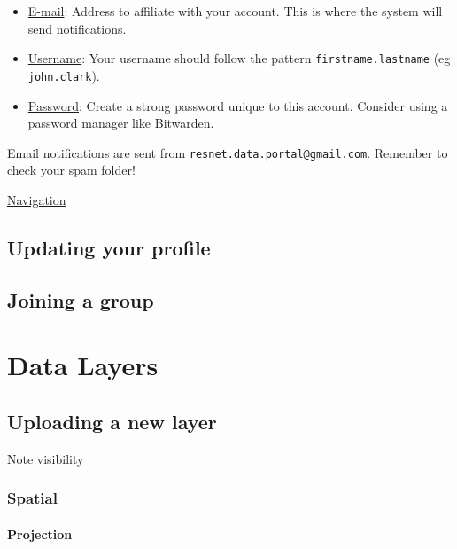 \documentclass[
]{book}
\providecommand{\tightlist}{%
  \setlength{\itemsep}{0pt}\setlength{\parskip}{0pt}}
\begin{document}
\begin{itemize}
\tightlist
\item
  \underline{E-mail}: Address to affiliate with your account. This is where the system will send notifications.
\item
  \underline{Username}: Your username should follow the pattern \texttt{firstname.lastname} (eg \texttt{john.clark}).
\item
  \underline{Password}: Create a strong password unique to this account. Consider using a password manager like \href{https://bitwarden.com/}{Bitwarden}.
\end{itemize}

Email notifications are sent from \texttt{resnet.data.portal@gmail.com}. Remember to check your spam folder!

\protect\hyperlink{navigation}{Navigation}

\hypertarget{updating-your-profile}{%
\section{Updating your profile}\label{updating-your-profile}}

\hypertarget{joining-a-group}{%
\section{Joining a group}\label{joining-a-group}}

\hypertarget{data-layers}{%
\chapter{Data Layers}\label{data-layers}}

\hypertarget{uploading-a-new-layer}{%
\section{Uploading a new layer}\label{uploading-a-new-layer}}

Note visibility

\hypertarget{spatial}{%
\subsection{Spatial}\label{spatial}}

\hypertarget{projection}{%
\subsubsection{Projection}\label{projection}}
\end{document}
